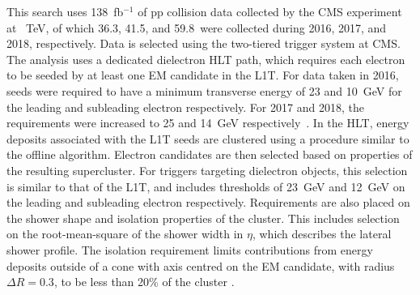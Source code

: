 This search uses 138~fb$^{-1}$ of pp collision data collected by the CMS experiment at \sqrts~TeV, of which 36.3, 41.5, and 59.8~\fbinv were collected during 2016, 2017, and 2018, respectively.
Data is selected using the two-tiered trigger system at CMS. 
The analysis uses a dedicated dielectron HLT path, which requires each electron to be seeded by at least one EM candidate in the L1T. For data taken in 2016, seeds were required to have a minimum transverse energy of 23 and 10~GeV for the leading and subleading electron respectively. For 2017 and 2018, the requirements were increased to 25 and 14~GeV respectively~\cite{CMS_egamma_performance}.
In the HLT, energy deposits associated with the L1T seeds are clustered using a procedure similar to the offline algorithm. Electron candidates are then selected based on properties of the resulting supercluster. For triggers targeting dielectron objects, this selection is similar to that of the L1T, and includes thresholds of 23~GeV and 12~GeV on the leading and subleading electron respectively.
Requirements are also placed on the shower shape and isolation properties of the cluster. 
This includes selection on the root-mean-square of the shower width in $\eta$, which describes the lateral shower profile.
The isolation requirement limits contributions from energy deposits outside of a cone with axis centred on the EM candidate, with radius $\Delta R=0.3$, to be less than 20\% of the cluster \Et.

